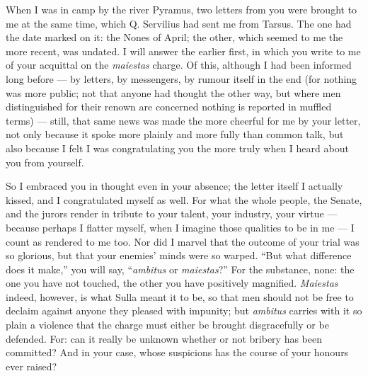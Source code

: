 

 When I was in camp by the river Pyramus, two letters from you were brought to me at the same time, which Q. Servilius had sent me from Tarsus. The one had the date marked on it: the Nones of April; the other, which seemed to me the more recent, was undated. I will answer the earlier first, in which you write to me of your acquittal on the \textit{maiestas} charge. Of this, although I had been informed long before --- by letters, by messengers, by rumour itself in the end (for nothing was more public; not that anyone had thought the other way, but where men distinguished for their renown are concerned nothing is reported in muffled terms) --- still, that same news was made the more cheerful for me by your letter, not only because it spoke more plainly and more fully than common talk, but also because I felt I was congratulating you the more truly when I heard about you from yourself.

 So I embraced you in thought even in your absence; the letter itself I actually kissed, and I congratulated myself as well. For what the whole people, the Senate, and the jurors render in tribute to your talent, your industry, your virtue --- because perhaps I flatter myself, when I imagine those qualities to be in me --- I count as rendered to me too. Nor did I marvel that the outcome of your trial was so glorious, but that your enemies' minds were so warped. ``But what difference does it make,'' you will say, ``\textit{ambitus} or \textit{maiestas}?'' For the substance, none: the one you have not touched, the other you have positively magnified. \textit{Maiestas} indeed, however, is what Sulla meant it to be, so that men should not be free to declaim against anyone they pleased with impunity; but \textit{ambitus} carries with it so plain a violence that the charge must either be brought disgracefully or be defended. For: can it really be unknown whether or not bribery has been committed? And in your case, whose suspicions has the course of your honours ever raised?

